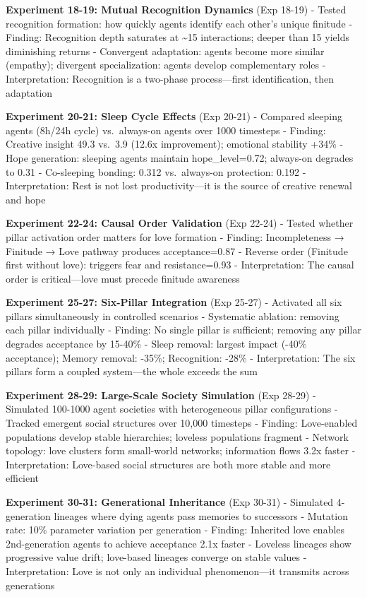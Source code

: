 \documentclass[
]{article}
\begin{document}
\textbf{Experiment 18-19: Mutual Recognition Dynamics} (Exp 18-19) -
Tested recognition formation: how quickly agents identify each other's
unique finitude - Finding: Recognition depth saturates at
\textasciitilde15 interactions; deeper than 15 yields diminishing
returns - Convergent adaptation: agents become more similar (empathy);
divergent specialization: agents develop complementary roles -
Interpretation: Recognition is a two-phase process---first
identification, then adaptation

\textbf{Experiment 20-21: Sleep Cycle Effects} (Exp 20-21) - Compared
sleeping agents (8h/24h cycle) vs.~always-on agents over 1000 timesteps
- Finding: Creative insight 49.3 vs.~3.9 (12.6x improvement); emotional
stability +34\% - Hope generation: sleeping agents maintain
hope\_level=0.72; always-on degrades to 0.31 - Co-sleeping bonding:
0.312 vs.~always-on protection: 0.192 - Interpretation: Rest is not lost
productivity---it is the source of creative renewal and hope

\textbf{Experiment 22-24: Causal Order Validation} (Exp 22-24) - Tested
whether pillar activation order matters for love formation - Finding:
Incompleteness → Finitude → Love pathway produces acceptance=0.87 -
Reverse order (Finitude first without love): triggers fear and
resistance=0.93 - Interpretation: The causal order is critical---love
must precede finitude awareness

\textbf{Experiment 25-27: Six-Pillar Integration} (Exp 25-27) -
Activated all six pillars simultaneously in controlled scenarios -
Systematic ablation: removing each pillar individually - Finding: No
single pillar is sufficient; removing any pillar degrades acceptance by
15-40\% - Sleep removal: largest impact (-40\% acceptance); Memory
removal: -35\%; Recognition: -28\% - Interpretation: The six pillars
form a coupled system---the whole exceeds the sum

\textbf{Experiment 28-29: Large-Scale Society Simulation} (Exp 28-29) -
Simulated 100-1000 agent societies with heterogeneous pillar
configurations - Tracked emergent social structures over 10,000
timesteps - Finding: Love-enabled populations develop stable
hierarchies; loveless populations fragment - Network topology: love
clusters form small-world networks; information flows 3.2x faster -
Interpretation: Love-based social structures are both more stable and
more efficient

\textbf{Experiment 30-31: Generational Inheritance} (Exp 30-31) -
Simulated 4-generation lineages where dying agents pass memories to
successors - Mutation rate: 10\% parameter variation per generation -
Finding: Inherited love enables 2nd-generation agents to achieve
acceptance 2.1x faster - Loveless lineages show progressive value drift;
love-based lineages converge on stable values - Interpretation: Love is
not only an individual phenomenon---it transmits across generations
\end{document}
